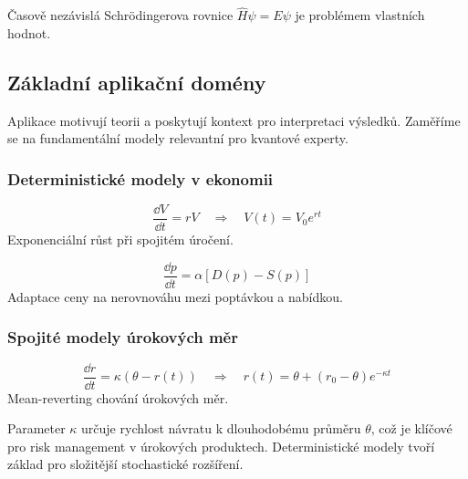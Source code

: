\begin{example}
Časově nezávislá Schrödingerova rovnice $\hat{H}\psi = E\psi$ je problémem vlastních hodnot.
\end{example}

\spc

\subsection{Základní aplikační domény}

\begin{motivation}
Aplikace motivují teorii a poskytují kontext pro interpretaci výsledků. Zaměříme se na fundamentální modely relevantní pro kvantové experty.
\end{motivation}

\subsubsection{Deterministické modely v ekonomii}

\begin{example}
\[
\frac{\dd V}{\dd t} = rV \quad \Rightarrow \quad V(t) = V_0 e^{rt}
\]
Exponenciální růst při spojitém úročení.
\end{example}

\begin{example}
\[
\frac{\dd p}{\dd t} = \alpha [D(p) - S(p)]
\]
Adaptace ceny na nerovnováhu mezi poptávkou a nabídkou.
\end{example}

\subsubsection{Spojité modely úrokových měr}

\begin{example}
\[
\frac{\dd r}{\dd t} = \kappa(\theta - r(t)) \quad \Rightarrow \quad r(t) = \theta + (r_0 - \theta)e^{-\kappa t}
\]
Mean-reverting chování úrokových měr.
\end{example}

\begin{intuition}
Parameter $\kappa$ určuje rychlost návratu k dlouhodobému průměru $\theta$, což je klíčové pro risk management v úrokových produktech. Deterministické modely tvoří základ pro složitější stochastické rozšíření.
\end{intuition}


